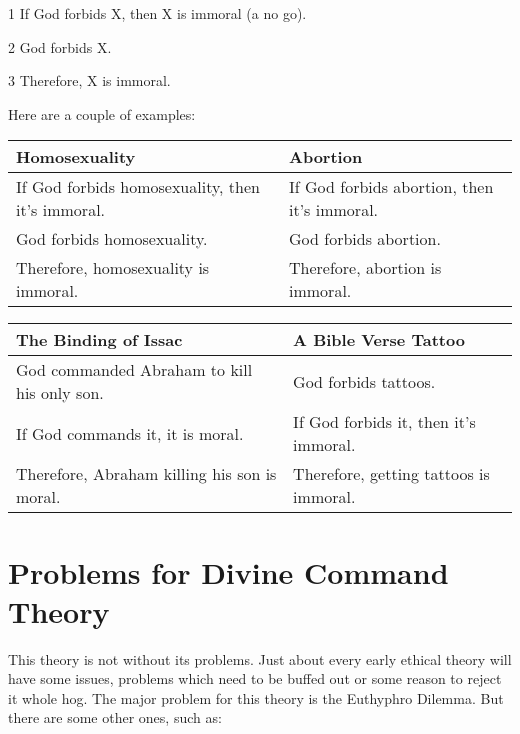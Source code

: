 \begin{earg}
    \item[1] If God forbids X, then X is immoral (a no go).
    \item[2] God forbids X.
    \item[3] Therefore, X is immoral.
\end{earg}

Here are a couple of examples:

\begin{tabular}{p{1.5in}|p{1.5in}}
Homosexuality&Abortion\\\hline
If God forbids homosexuality, then it’s immoral.& If God forbids abortion, then it’s immoral.\\
God forbids homosexuality.&    God forbids abortion.\\
Therefore, homosexuality is immoral.&Therefore, abortion is immoral.
\end{tabular}

\begin{tabular}{p{1.5in}|p{1.5in}}
The Binding of Issac&A Bible Verse Tattoo\\\hline
God commanded Abraham to kill his only son.&God forbids tattoos.\\
If God commands it, it is moral.&If God forbids it, then it’s immoral.\\
Therefore, Abraham killing his son is moral.&Therefore, getting tattoos is immoral.
\end{tabular}

\section{Problems for Divine Command Theory}

This theory is not without its problems. Just about every early ethical theory will have some issues, problems which need to be buffed out or some reason to reject it whole hog. The major problem for this theory is the Euthyphro Dilemma.  But there are some other ones, such as:




